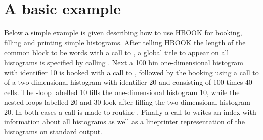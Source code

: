 \newpage

\section{A basic example}
\label{HSIMPLEXA}

Below a simple example is given describing 
how to use HBOOK for booking, filling and printing simple histograms.
After telling HBOOK the length of the  common block
to be  words with a call to , a 
global title to appear on all histograms is specified by calling
. 
Next a 100 bin one-dimensional histogram with identifier 10 is booked 
with a call to , followed by the booking 
using a call to  of a two-dimensional histogram with identifier 20 
and consisting of 100 times 40 cells.
The -loop labelled 10 fills the one-dimensional histogram 10,
while the nested  loops labelled 20 and 30 look after filling
the two-dimensional histogram 20. 
In both cases a call is made to routine .
Finally a call to  writes an index with information 
about all histograms as well as a lineprinter representation of
the histograms on standard output.

